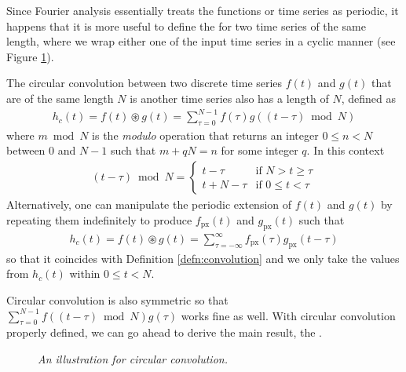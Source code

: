 Since Fourier analysis essentially treats the functions or time series as periodic, it happens that it is more useful to define the  for two time series of the same length, where we wrap either one of the input time series in a cyclic manner (see Figure \ref{fig:circconvschm}).
\begin{defn}
The circular convolution  between two discrete time series $f(t)$ and $g(t)$ that are of the same length $N$ is another time series also has a length of $N$, defined as
\begin{align}
h_c(t) = f(t) \circledast g(t) = \sum_{\tau=0}^{N-1} f(\tau) g((t-\tau) \bmod N)
\end{align}
where $m \bmod N$ is the \textit{modulo} operation that returns an integer $0 \leq n < N$ between $0$ and $N-1$ such that $m + qN = n$ for some integer $q$. In this context
\begin{align}
(t-\tau) \bmod N = 
\begin{cases}
t - \tau & \text{if $N > t \geq \tau$} \\
t + N - \tau & \text{if $0\leq t < \tau$}
\end{cases}
\end{align}
Alternatively, one can manipulate the periodic extension of $f(t)$ and $g(t)$ by repeating them indefinitely to produce $f_\text{px}(t)$ and $g_\text{px}(t)$ such that 
\begin{align}
h_c(t) = f(t) \circledast g(t) = \sum_{\tau=-\infty}^{\infty} f_\text{px}(\tau) g_\text{px}(t-\tau)
\end{align}
so that it coincides with Definition \ref{defn:convolution} and we only take the values from $h_c(t)$ within $0 \leq t < N$.
\end{defn}
Circular convolution is also symmetric so that $\sum_{\tau=0}^{N-1} f((t-\tau) \bmod N) g(\tau)$ works fine as well. With circular convolution properly defined, we can go ahead to derive the main result, the .
\begin{figure}
    \centering
    \caption{\textit{An illustration for circular convolution.}}
    \label{fig:circconvschm}
\end{figure}
